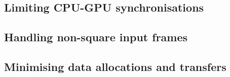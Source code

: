 \subsection{Limiting CPU-GPU synchronisations}


\subsection{Handling non-square input frames}


\subsection{Minimising data allocations and transfers}
